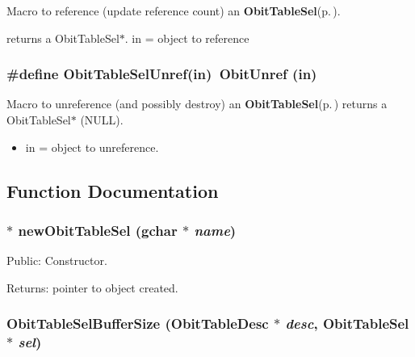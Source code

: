 Macro to reference (update reference count) an {\bf Obit\-Table\-Sel}{\rm (p.\,\pageref{structObitTableSel})}. 

returns a Obit\-Table\-Sel$\ast$. in = object to reference 
\subsubsection{\setlength{\rightskip}{0pt plus 5cm}\#define Obit\-Table\-Sel\-Unref(in)\ Obit\-Unref (in)}\label{ObitTableSel_8h_a0}


Macro to unreference (and possibly destroy) an {\bf Obit\-Table\-Sel}{\rm (p.\,\pageref{structObitTableSel})} returns a Obit\-Table\-Sel$\ast$ (NULL). 

\begin{itemize}
\item in = object to unreference. \end{itemize}


\subsection{Function Documentation}
\subsubsection{$\ast$ new\-Obit\-Table\-Sel (gchar $\ast$ {\em name})}\label{ObitTableSel_8h_a4}


Public: Constructor. 

\begin{Desc}
\item[Returns:]pointer to object created. \end{Desc}
\subsubsection{ Obit\-Table\-Sel\-Buffer\-Size ({\bf Obit\-Table\-Desc} $\ast$ {\em desc}, {\bf Obit\-Table\-Sel} $\ast$ {\em sel})}\label{ObitTableSel_8h_a7}



